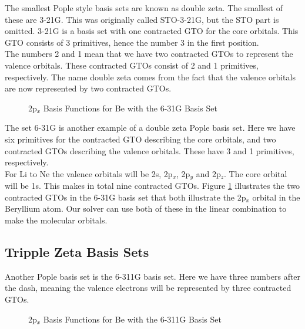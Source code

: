 \documentclass[a4paper,norsk,11pt,twoside]{report}
\begin{document}
The smallest Pople style basis sets are known as double zeta. The
smallest of these are 3-21G. This was originally called STO-3-21G, but
the STO part is omitted. 3-21G is a basis set with one contracted GTO
for the core orbitals. This GTO consists of 3 primitives, hence the
number 3 in the first position. \\

The numbers 2 and 1 mean that we have two contracted GTOs to
represent the valence orbitals. These contracted GTOs consist of 2 and
1 primitives, respectively. The name double zeta comes from the fact that the valence
orbitals are now represented by two contracted GTOs. \\

\begin{figure}[h!]
\begin{center}
\caption{2p$_x$ Basis Functions for Be with the 6-31G Basis Set}
\label{fig:basis_set_6_31G}
\end{center}
\end{figure}

The set 6-31G is another example of a double zeta Pople basis
set. Here we have six primitives for the contracted GTO describing the
core orbitals, and two contracted GTOs describing the valence
orbitals. These have 3 and 1 primitives, respectively. \\

For Li to Ne the valence orbitals will be 2s, 2p$_x$, 2p$_y$ and
2p$_z$. The core orbital will be 1s. This makes in total nine
contracted GTOs. Figure \ref{fig:basis_set_6_31G} illustrates the two
contracted GTOs in the 6-31G basis set that both illustrate the 2p$_x$
orbital in the Beryllium atom. Our solver can use both of these in the
linear combination to make the molecular orbitals.

\subsection{Tripple Zeta Basis Sets}
Another Pople basis set is the 6-311G basis set. Here we have three
numbers after the dash, meaning the valence electrons will be
represented by three contracted GTOs. \\

\begin{figure}[h!]
\begin{center}
\caption{2p$_x$ Basis Functions for Be with the 6-311G Basis Set}
\label{fig:basis_set_6_311G}
\end{center}
\end{figure}
\end{document}
